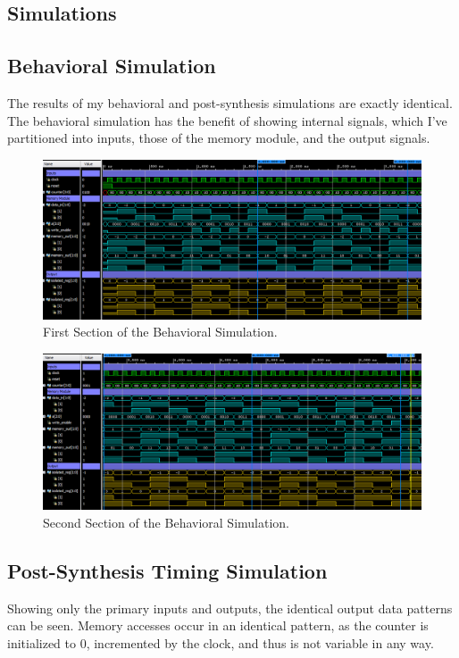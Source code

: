 \documentclass[a4paper, 12pt]{article}
\begin{document}
\begin{landscape}
\section{Simulations}
\subsection{Behavioral Simulation}
The results of my behavioral and post-synthesis simulations are exactly identical. The behavioral simulation has the benefit of showing internal signals, which I've partitioned into inputs, those of the memory module, and the output signals.

\begin{figure}[H]
\centering
\includegraphics[width=0.85\paperheight, keepaspectratio=true]{Sources/Behav-Sim-Small-1.PNG}
\caption{First Section of the Behavioral Simulation.}
\label{fig:behav-sim}
\end{figure}

\begin{figure}[H]
\centering
\includegraphics[width=0.85\paperheight, keepaspectratio=true]{Sources/Behav-Sim-Small-2.PNG}
\caption{Second Section of the Behavioral Simulation.}
\label{fig:behav-sim}
\end{figure}

\subsection{Post-Synthesis Timing Simulation}
Showing only the primary inputs and outputs, the identical output data patterns can be seen. Memory accesses occur in an identical pattern, as the counter is initialized to 0, incremented by the clock, and thus is not variable in any way.


\end{landscape}
\end{document}
